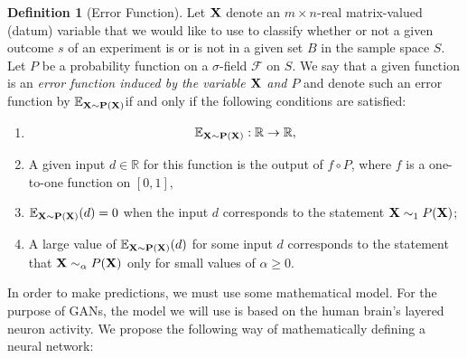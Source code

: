 \documentclass[12pt]{amsart}
\newcommand{\RR}{{\mathbb R}}
\newcommand{\EE}{{\mathbb E}}
\theoremstyle{definition}
\newtheorem{definition}[theorem]{Definition}
\theoremstyle{remark}
\begin{document}
\begin{definition}[Error Function] 
Let 
${\bf X}$ denote an $m\times n$-real matrix-valued (datum) variable that we would
like to use to classify whether or not a given outcome $s$ of an experiment is
or is not in a given set $B$ in the sample space $S$.  Let $P$ be a probability 
function on a $\sigma$-field ${\mathcal F}$ on $S$.  We say that a given function is an 
{\em error function induced by the variable ${\bf X}$ and $P$} and denote 
such  an error function by $\EE_{{\bf X}\sim{\bf P}({\bf X})}$if and only if the following
conditions are satisfied:
        \begin{enumerate}
                \item   
                    \begin{align*}
                        \EE_{{\bf X}\sim {\bf P}({\bf X})} : \RR \to \RR,
                    \end{align*}
                \item A given input $d\in\RR$ for this function is the output of
                    $f\circ P$, where $f$ is a one-to-one function on $[0,1]$,
                \item $\EE_{{\bf X}\sim{\bf P}({\bf X})}(d)=0$ when the input $d$
                    corresponds to the statement ${\bf X}\sim_1 P({\bf X})$;
                \item  A large value of $\EE_{{\bf X}\sim{\bf P}({\bf X})}(d)$ 
                    for some input $d$ corresponds to the statement that 
                    ${\bf X}\sim_\alpha P({\bf X})$ only for
                    small values of $\alpha\geq 0$.
        \end{enumerate}
\end{definition}



In order to make predictions, we must use some mathematical model. For the 
purpose of GANs, the model we will use is based on the human brain's layered 
neuron activity. We propose the following way of mathematically defining a 
neural network:
\end{document}
